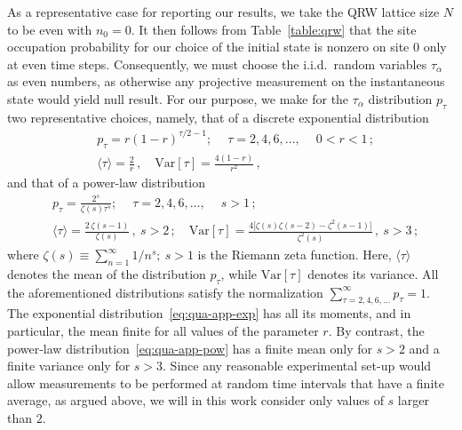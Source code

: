 \documentclass[12pt]{iopart}
\begin{document}
As a representative case for reporting our results, we take the QRW lattice size $N$ to be
even with $n_0=0$. It then follows from Table~\ref{table:qrw} that the
site occupation probability for our choice of the initial state is
nonzero on site $0$ only at even time steps. Consequently, we must choose
the i.i.d.~random variables $\tau_\alpha$ as even numbers, as otherwise any
projective measurement on the instantaneous state would yield null
result. For our purpose, we make for the $\tau_\alpha$ distribution $p_\tau$
two representative choices, namely, that of a discrete
exponential distribution
\begin{equation}
\begin{aligned}
\label{eq:qua-app-exp}
& p_{\tau} = r(1-r)^{\tau/2-1};~\quad \tau=2,4,6,\ldots,~\quad 0 < r < 1 \, ; \\
& \langle \tau \rangle = \frac{2}{r} \, , \quad {\mathrm{Var}}[\tau] = \frac{4(1-r)}{r^2} \, ,
\end{aligned}
\end{equation}
and that of a power-law distribution 
\begin{equation}
\begin{aligned}
\label{eq:qua-app-pow}
& p_{\tau}= \frac{2^s}{\zeta(s) \tau^s};~\quad \tau=2,4,6,\ldots,~\quad s > 1\, ;  \\
& \langle \tau \rangle =  \frac{ 2 \,\zeta(s-1)}{\zeta(s)} \, , ~ s>2 \, ;\quad {\mathrm{Var}}[\tau] = \frac{4\big[\zeta(s)\zeta(s-2)-\zeta^2(s-1)\big]}{\zeta^2(s)} \, ,~ s>3 \, ;
\end{aligned}
\end{equation}
where $\zeta(s)\equiv \sum_{n=1}^\infty 1/n^s ; ~s>1$ is the Riemann zeta function. Here,  $\langle \tau \rangle$ denotes the mean of the distribution $p_\tau$, while $\mathrm{Var}[\tau]$ denotes its variance.  All the aforementioned distributions satisfy the normalization $\sum_{\tau=2,4,6,\ldots}^{\infty} p_{\tau} = 1$.
The exponential distribution~\eqref{eq:qua-app-exp} has all its moments,
and in particular, the mean finite for all values
of the parameter $r$. By contrast, the power-law distribution~\eqref{eq:qua-app-pow} has a finite mean only
for $s>2$ and a finite variance only for $s>3$. Since any
reasonable experimental set-up would allow measurements to be performed
at random time intervals that have a finite average, as argued above, we will in this work
consider only values of $s$ larger than $2$. 
\end{document}
